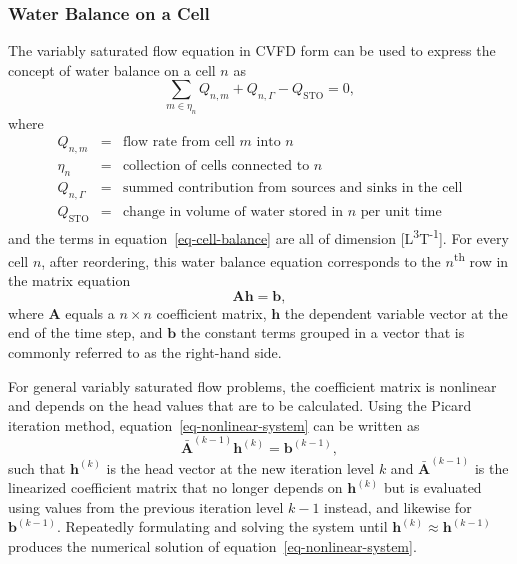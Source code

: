 \documentclass[fleqn]{article}
\begin{document}
\subsubsection*{Water Balance on a Cell}
The variably saturated flow equation in CVFD form can be used to
express the concept of water balance on a cell $n$ as
\begin{equation}
  \sum_{m \in \eta_n} Q_{n,m} + Q_{n, \Gamma} - Q_{\textrm{STO}} = 0,
  \label{eq-cell-balance}
\end{equation}
where
\begin{eqnarray*}
  Q_{n,m} &=& \text{flow rate from cell $m$ into $n$} \\
  \eta_n &=& \text{collection of cells connected to $n$} \\
  Q_{n,\Gamma} &=& \text{summed contribution from sources and sinks in the cell} \\
  Q_{\textrm{STO}} &=& \text{change in volume of water stored in $n$ per unit time}
\end{eqnarray*}
and the terms in equation~\ref{eq-cell-balance} are all of dimension
[L\textsuperscript{3}T\textsuperscript{-1}]. For every cell $n$, after
reordering, this water balance equation corresponds to the 
$n$\textsuperscript{th} row in the matrix equation
\begin{equation}
  \mathbf{A}\mathbf{h} = \mathbf{b},
  \label{eq-nonlinear-system}
\end{equation}
where $\mathbf{A}$ equals a $n \times n$ coefficient matrix, $\mathbf{h}$
the dependent variable vector at the end of the time step, and
$\mathbf{b}$ the constant terms grouped in a vector that is commonly
referred to as the right-hand side. 

For general variably saturated flow problems, the coefficient matrix is 
nonlinear and depends on the head values that are to be calculated. 
Using the Picard iteration method, equation~\ref{eq-nonlinear-system} 
can be written as
\begin{equation}
  \mathbf{\bar{A}}^{(k-1)} \mathbf{h}^{(k)} = \mathbf{b}^{(k-1)},
  \label{eq-linearized-system}
\end{equation}
such that $\mathbf{h}^{(k)}$ is the head vector at the new iteration level
$k$ and $\mathbf{\bar{A}}^{(k-1)}$ is the linearized coefficient matrix
that no longer depends on $\mathbf{h}^{(k)}$ but is evaluated using values
from the previous iteration level $k-1$ instead, and likewise for 
$\mathbf{b}^{(k-1)}$. Repeatedly formulating and solving the system until 
$\mathbf{h}^{(k)} \approx \mathbf{h}^{(k-1)}$ produces the numerical 
solution of equation~\ref{eq-nonlinear-system}.
\end{document}
